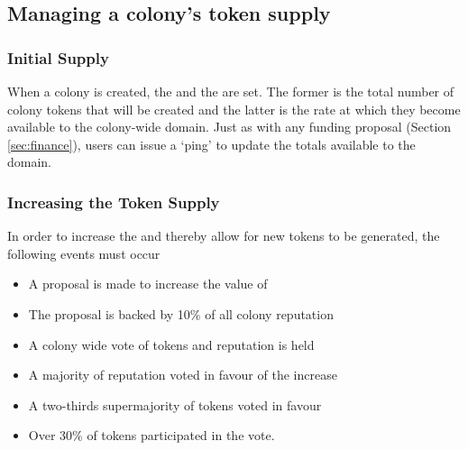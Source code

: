  
\subsection{Managing a colony's token supply}\label{sec:colony-token-managements}
\subsubsection{Initial Supply}
When a colony is created, the  and the  are set. The former is the total number of colony tokens that will be created and the latter is the rate at which they become available to the colony-wide domain. Just as with any funding proposal (Section \ref{sec:finance}), users can issue a `ping' to update the totals available to the domain.

\subsubsection{Increasing the Token Supply}
In order to increase the  and thereby allow for new tokens to be generated, the following events must occur
\begin{itemize}
 \item A proposal is made to increase the value of 
 \item The proposal is backed by 10\% of all colony reputation
 \item A colony wide vote of tokens and reputation is held
 \item A majority of reputation voted in favour of the increase
 \item A two-thirds supermajority of tokens voted in favour
 \item Over 30\% of tokens participated in the vote.
\end{itemize}

